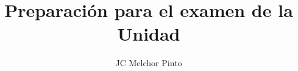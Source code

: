 \documentclass[12pt,addpoints]{repaso}
\title{Preparación para el examen de la Unidad}
\author{JC Melchor Pinto}
\begin{document}
\INFO%
\begin{questions}
    \questionboxed[10]{}
    \questionboxed[20]{}
    \ejemplosboxed[]
    \questionboxed[15]{}
    \ejemplosboxed[]
    \questionboxed[40]{}
    \ejemplosboxed[]
    \questionboxed[15]{}
\end{questions}
\end{document}
